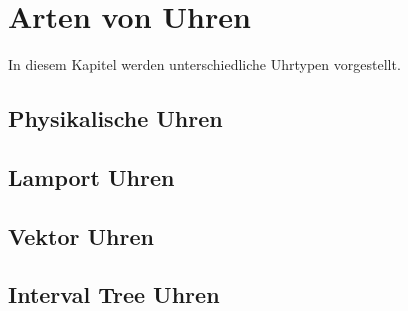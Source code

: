 \section{Arten von Uhren}
In diesem Kapitel werden unterschiedliche Uhrtypen vorgestellt.
\subsection{Physikalische Uhren}
\subsection{Lamport Uhren}
\subsection{Vektor Uhren}
\subsection{Interval Tree Uhren}